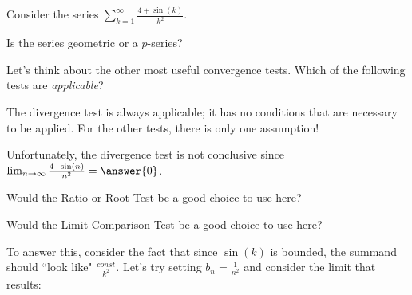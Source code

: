 \documentclass{ximera}
\author{Jim Talamo}
\begin{document}
\begin{exercise}

Consider the series $\sum_{k=1}^{\infty} \frac{4+\sin(k)}{k^2}$.  

Is the series geometric or a $p$-series?

\begin{multipleChoice}
\end{multipleChoice}

Let's think about the other most useful convergence tests.  Which of the following tests are \emph{applicable}?

\begin{selectAll}
\end{selectAll}

\begin{hint}
The divergence test is always applicable; it has no conditions that are necessary to be applied. For the other tests, there is only one assumption!
\end{hint}

\begin{exercise}
Unfortunately, the divergence test is not conclusive since $\lim_{n \to \infty} \frac{4+\sin(n)}{n^2} = \answer{0}$.  
\end{exercise}

\begin{exercise}
Would the Ratio or Root Test be a good choice to use here?

\begin{multipleChoice}
\end{multipleChoice}
\end{exercise}

\begin{exercise}
Would the Limit Comparison Test be a good choice to use here?  

To answer this, consider the fact that since $\sin(k)$ is bounded,  the summand should ``look like" $\frac{const}{k^2}$.  Let's try setting $b_n = \frac{1}{n^2}$ and consider the limit that results:


\end{exercise}
\end{exercise}
\end{document}
